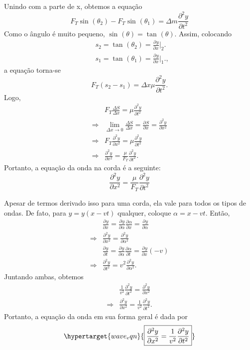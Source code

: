 \documentclass[physicsII_notes.tex]{subfiles}
\begin{document}
Unindo com a parte de x, obtemos a equação
\[
	F_{T}\sin^{}{(\theta_{2})} - F_{T}\sin^{}{(\theta_{1})} = \Delta m \frac{\partial^{2}{y}}{\partial{t^{2}}}
\]
Como o ângulo é muito pequeno, \(\sin^{}{(\theta )} = \tan^{}{(\theta )}\). Assim, colocando
\begin{align*}
	 & s_{2} = \tan^{}{(\theta_{2})} = \frac{\partial^{}y}{\partial x^{}}\biggl|_{2}^{}\biggr.  \\
	 & s_{1} = \tan^{}{(\theta_{1})} = \frac{\partial^{}y}{\partial x^{}}\biggl|_{1}^{}\biggr.,
\end{align*}
a equação torna-se
\[
	F_{T}(s_{2}-s_{1}) = \Delta x\mu \frac{\partial^{2}y}{\partial t^{2}}.
\]
Logo,
\begin{align*}
	            & F_{T}\frac{\Delta S}{\Delta x} = \mu \frac{\partial^{2}y}{\partial t^{2}}                                              \\
	\Rightarrow & \lim_{\Delta x\to 0}\frac{\Delta S}{\Delta x}= \frac{\partial^{}S}{\partial x^{}}=\frac{\partial^{2}y}{\partial x^{2}} \\
	\Rightarrow & F_{T}\frac{\partial^{2}y}{\partial x^{2}}=\mu \frac{\partial^{2}y}{\partial t^{2}}                                     \\
	\Rightarrow & \frac{\partial^{2}y}{\partial x^{2}}=\frac{\mu}{F_{T}}\frac{\partial^{2}y}{\partial t^{2}}.
\end{align*}
Portanto, a equação da onda na corda é a seguinte:
\[
	\boxed{\frac{\partial^{2}y}{\partial x^{2}}=\frac{\mu}{F_{T}}\frac{\partial^{2}y}{\partial t^{2}}}
\]

Apesar de termos derivado isso para uma corda, ela vale para todos os tipos de ondas. De fato, para
\(y = y(x-vt)\) qualquer, coloque \(\alpha  = x - vt\). Então,
\begin{align*}
	            & \frac{\partial^{}y}{\partial x^{}} = \frac{\partial^{}y}{\partial \alpha ^{}}\frac{\partial^{}\alpha }{\partial x^{}} = \frac{\partial^{}y}{\partial \alpha ^{}} \\
	\Rightarrow & \frac{\partial^{2}y}{\partial x^{2}} = \frac{\partial^{2}y}{\partial \alpha ^{2}}                                                                                \\
	            & \frac{\partial^{}y}{\partial t^{}}=\frac{\partial^{}y}{\partial \alpha ^{}}\frac{\partial^{}\alpha }{\partial t^{}}=\frac{\partial^{}y}{\partial x^{}}(-v)       \\
	\Rightarrow & \frac{\partial^{2}y}{\partial t^{2}}=v^{2}\frac{\partial^{2}y}{\partial \alpha ^{2}}.
\end{align*}
Juntando ambas, obtemos
\begin{align*}
	            & \frac{1}{v^{2}}\frac{\partial^{2}y}{\partial t^{2}}=\frac{\partial^{2}y}{\partial x^{2}}  \\
	\Rightarrow & \frac{\partial^{2}y}{\partial x^{2}}=\frac{1}{v^{2}}\frac{\partial^{2}y}{\partial t^{2}}.
\end{align*}
Portanto, a equação da onda em sua forma geral é dada por
\[
	\hypertarget{wave_eqn}{\boxed{\frac{\partial^{2}y}{\partial x^{2}}=\frac{1}{v^{2}}\frac{\partial^{2}y}{\partial t^{2}}}}
\]
\end{document}
